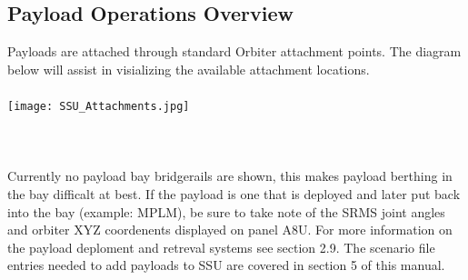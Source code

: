 \documentclass[13pt, letter,final]{article}
\begin{document}
\subsection*{\large Payload Operations Overview}
Payloads are attached through standard Orbiter attachment points. The diagram below will assist in visializing the available attachment locations.\\
\\
\texttt{[image: SSU\_Attachments.jpg]}
\\
\\
\\
\\
Currently no payload bay bridgerails are shown, this makes payload berthing in the bay difficalt at best.  If the payload is one that is deployed and later put back into the bay (example: MPLM), be sure to take note of the SRMS joint angles and orbiter XYZ coordenents displayed on panel A8U. For more information on the payload deploment and retreval systems see section 2.9. The scenario file entries needed to add payloads to SSU are covered in section 5 of this manual. \\
\\
\newpage
\end{document}
